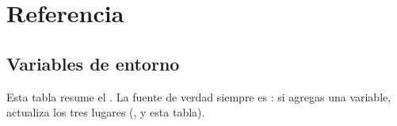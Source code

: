\chapter{Referencia}
\label{cap:referencia}

\section{Variables de entorno}
\label{sec:variables}

Esta tabla resume el . La fuente de verdad siempre es
: si agregas una variable, actualiza los tres lugares
(,  y esta tabla).

